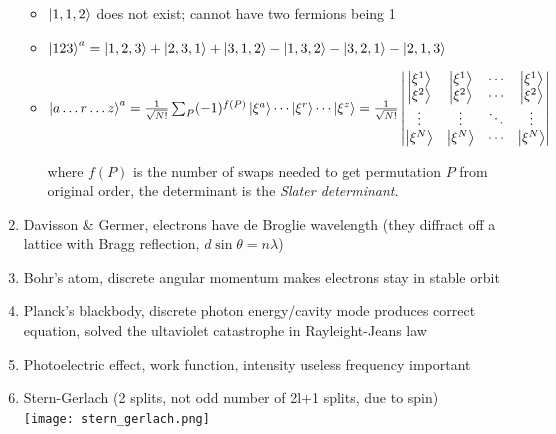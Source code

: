 \documentclass{article}
\theoremstyle{remark}
\theoremstyle{remark}
\newcommand{\where}[1]{\begin{flushright}where #1.\end{flushright}}
\begin{document}
\begin{enumerate}
\begin{itemize}
        \item $\ket{1,1,2}$ does not exist; cannot have two fermions being 1
        \item $\ket{123}^a = \ket{1,2,3}+\ket{2,3,1}+\ket{3,1,2}-\ket{1,3,2}-\ket{3,2,1}-\ket{2,1,3}$
        \item $\ket{a\ldots r\ldots z}^a=\frac{1}{\sqrt{N!}}\sum_P(-1)^{f(P)}\ket{\xi^a}\cdots\ket{\xi^r}\cdots\ket{\xi^z} = \frac{1}{\sqrt{N!}}\begin{vmatrix}
                    \ket{\xi^1} & \ket{\xi^1} & \cdots & \ket{\xi^1}\\
                    \ket{\xi^2} & \ket{\xi^2} & \cdots & \ket{\xi^2}\\
                    \vdots & \vdots & \ddots & \vdots\\
                    \ket{\xi^N} & \ket{\xi^N} & \cdots & \ket{\xi^N}\\
                \end{vmatrix}$
                \where{$f(P)$ is the number of swaps needed to get permutation $P$ from original order,\newline
                            the determinant is the \emph{Slater determinant}}
    \end{itemize}
    \item Davisson \& Germer, electrons have de Broglie wavelength (they diffract off a lattice with Bragg reflection, $d\sin\theta=n\lambda$)        
    \item Bohr's atom, discrete angular momentum makes electrons stay in stable orbit
    \item Planck's blackbody, discrete photon energy/cavity mode produces correct equation, solved the ultaviolet catastrophe in Rayleight-Jeans law
    \item Photoelectric effect, work function, intensity useless frequency important
    \item Stern-Gerlach (2 splits, not odd number of 2l+1 splits, due to spin)\\
        \texttt{[image: stern\_gerlach.png]}
\end{enumerate}
\end{document}
